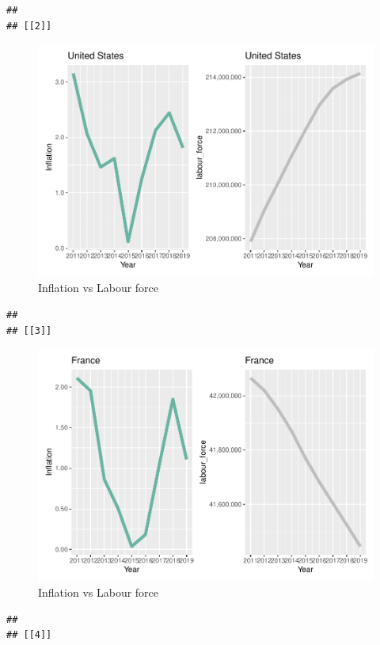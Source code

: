 \documentclass[
]{article}
\begin{document}
\begin{verbatim}
## 
## [[2]]
\end{verbatim}

\begin{figure}
\centering
\includegraphics{The_Outsiders_5513_files/figure-latex/A1-2.pdf}
\caption{Inflation vs Labour force}
\end{figure}

\begin{verbatim}
## 
## [[3]]
\end{verbatim}

\begin{figure}
\centering
\includegraphics{The_Outsiders_5513_files/figure-latex/A1-3.pdf}
\caption{Inflation vs Labour force}
\end{figure}

\begin{verbatim}
## 
## [[4]]
\end{verbatim}
\end{document}
